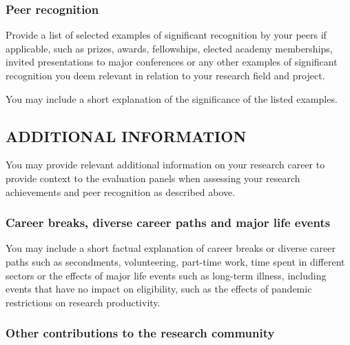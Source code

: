 \documentclass[timesnewroman,partone,draftproposal]{erc-stg}
\begin{document}
\subsubsection*{Peer recognition}

\begin{erccomment}
Provide a list of selected examples of significant recognition by your peers
if applicable, such as prizes, awards, fellowships, elected academy
memberships, invited presentations to major conferences or any other examples
of significant recognition you deem relevant in relation to your research field
and project.

You may include a short explanation of the significance of the listed examples.
\end{erccomment}

\subsection*{ADDITIONAL INFORMATION}
\label{ssc:cv:additional_information}

\begin{erccomment}
You may provide relevant additional information on your research career to
provide context to the evaluation panels when assessing your research
achievements and peer recognition as described above.
\end{erccomment}

\subsubsection*{Career breaks, diverse career paths and major life events}

\begin{erccomment}
You may include a short factual explanation of career breaks or diverse career paths
such as secondments, volunteering, part-time work, time spent in different sectors or
the effects of major life events such as long-term illness, including events that have
no impact on eligibility, such as the effects of pandemic restrictions on research
productivity.
\end{erccomment}

\subsubsection*{Other contributions to the research community}
\end{document}

